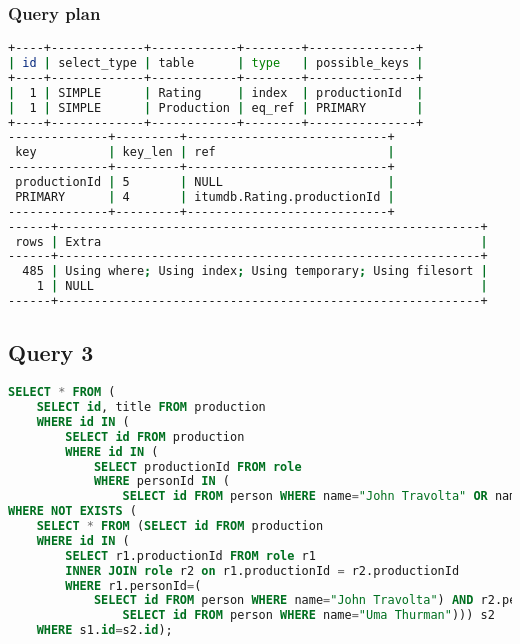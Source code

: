 \subsubsection{Query plan}
\begin{lstlisting}[language=bash]
+----+-------------+------------+--------+---------------+
| id | select_type | table      | type   | possible_keys |
+----+-------------+------------+--------+---------------+
|  1 | SIMPLE      | Rating     | index  | productionId  |
|  1 | SIMPLE      | Production | eq_ref | PRIMARY       |
+----+-------------+------------+--------+---------------+
--------------+---------+----------------------------+
 key          | key_len | ref                        |
--------------+---------+----------------------------+
 productionId | 5       | NULL                       |
 PRIMARY      | 4       | itumdb.Rating.productionId |
--------------+---------+----------------------------+
------+-----------------------------------------------------------+
 rows | Extra                                                     |
------+-----------------------------------------------------------+
  485 | Using where; Using index; Using temporary; Using filesort |
    1 | NULL                                                      |
------+-----------------------------------------------------------+
\end{lstlisting}


\bigskip
\subsection{Query 3}
\begin{lstlisting}[language=sql]
SELECT * FROM (
	SELECT id, title FROM production
	WHERE id IN (
		SELECT id FROM production
		WHERE id IN (
			SELECT productionId FROM role
			WHERE personId IN (
				SELECT id FROM person WHERE name="John Travolta" OR name="Uma Thurman")))) s1
WHERE NOT EXISTS (
	SELECT * FROM (SELECT id FROM production 
	WHERE id IN (
		SELECT r1.productionId FROM role r1
		INNER JOIN role r2 on r1.productionId = r2.productionId 
		WHERE r1.personId=(
			SELECT id FROM person WHERE name="John Travolta") AND r2.personId=(
				SELECT id FROM person WHERE name="Uma Thurman"))) s2 
	WHERE s1.id=s2.id);
\end{lstlisting}

